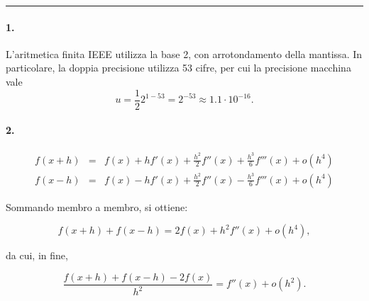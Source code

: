 \hrule

\paragraph{1.} L'aritmetica finita IEEE utilizza la base 2, con arrotondamento della mantissa. In particolare, la doppia precisione utilizza 53 cifre, per cui la precisione macchina vale
\begin{equation*}
	u = \frac{1}{2} 2 ^{1 - 53} = 2^{-53} \approx 1.1 \cdot 10^{-16}.
\end{equation*}

\paragraph{2.}
\begin{equation*}
	\begin{matrix}
		f(x+h) &=& f(x) + h f'(x) + \frac{h^2}{2} f''(x) + \frac{h^3}{6} f'''(x) + o(h^4)\\
		f(x-h) &=& f(x) - h f'(x) + \frac{h^2}{2} f''(x) - \frac{h^3}{6} f'''(x) + o(h^4)
	\end{matrix}
\end{equation*}

Sommando membro a membro, si ottiene:

\begin{equation*}
	f(x+h) + f(x-h) = 2 f(x) + h^2 f''(x) + o(h^4),
\end{equation*}

da cui, in fine,

\begin{equation*}
	\frac{f(x+h) + f(x-h) - 2 f(x)}{h^2} = f''(x) + o(h^2).
\end{equation*}